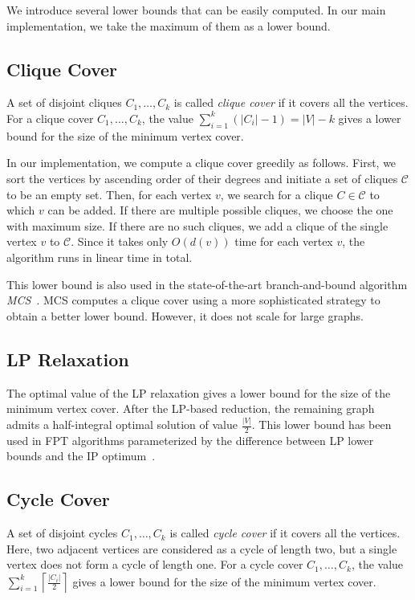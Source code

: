 \documentclass[11pt]{article}
\begin{document}
We introduce several lower bounds that can be easily computed.
In our main implementation, we take the maximum of them as a lower bound.

\subsection{Clique Cover}\label{sec:lower_bounds:clique}
A set of disjoint cliques $C_1,\ldots,C_k$ is called \emph{clique cover} if it covers all the vertices.
For a clique cover $C_1,\ldots,C_k$, the value $\sum_{i=1}^k(|C_i|-1)=|V|-k$ gives a lower bound for
the size of the minimum vertex cover.

In our implementation, we compute a clique cover greedily as follows.
First, we sort the vertices by ascending order of their degrees and initiate a set of cliques $\mathcal{C}$ to be an
empty set.
Then, for each vertex $v$, we search for a clique $C\in\mathcal{C}$ to which $v$ can be added.
If there are multiple possible cliques, we choose the one with maximum size.
If there are no such cliques, we add a clique of the single vertex $v$ to $\mathcal{C}$.
Since it takes only $O(d(v))$ time for each vertex $v$, the algorithm runs in linear time in total.

This lower bound is also used in the state-of-the-art branch-and-bound algorithm \emph{MCS}~\cite{clique/mcs_walcom10}.
MCS computes a clique cover using a more sophisticated strategy to obtain a better lower bound.
However, it does not scale for large graphs.

\subsection{LP Relaxation}\label{sec:lower_bounds:lp}
The optimal value of the LP relaxation gives a lower bound for the size of the minimum vertex cover.
After the LP-based reduction, the remaining graph admits a half-integral optimal solution of value $\frac{|V|}{2}$.
This lower bound has been used in FPT algorithms parameterized by the difference between LP lower bounds and the IP
optimum~\cite{DBLP:journals/corr/abs-1203-0833,bip2/iwata14}.

\subsection{Cycle Cover}\label{sec:lower_bounds:cycle}
A set of disjoint cycles $C_1,\ldots,C_k$ is called \emph{cycle cover} if it covers all the vertices.
Here, two adjacent vertices are considered as a cycle of length two, but a single vertex does not form a cycle of
length one.
For a cycle cover $C_1,\ldots,C_k$, the value $\sum_{i=1}^k\left\lceil\frac{|C_i|}{2}\right\rceil$ gives a
lower bound for the size of the minimum vertex cover.
\end{document}
